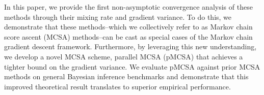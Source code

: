 
%
In this paper, we provide the first non-asymptotic convergence analysis of these methods through their mixing rate and gradient variance.
To do this, we demonstrate that these methods--which we collectively refer to as Markov chain score ascent (MCSA) methods--can be cast as special cases of the Markov chain gradient descent framework.
Furthermore, by leveraging this new understanding, we develop a novel MCSA scheme, parallel MCSA (pMCSA) that achieves a tighter bound on the gradient variance.
We evaluate pMCSA against prior MCSA methods on general Bayesian inference benchmarks and demonstrate that this improved theoretical result translates to superior empirical performance.



